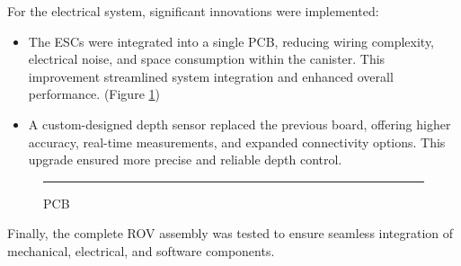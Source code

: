 For the electrical system, significant innovations were implemented:

\vspace{-0.5\baselineskip}
\begin{itemize}
    \setlength{\itemsep}{0pt}
    \item The ESCs were integrated into a single PCB, reducing wiring complexity, electrical noise, and space consumption within the canister. This improvement streamlined system integration and enhanced overall performance. (Figure \ref{fig:pcb})
    \item A custom-designed depth sensor replaced the previous board, offering higher accuracy, real-time measurements, and expanded connectivity options. This upgrade ensured more precise and reliable depth control.
\end{itemize}

\begin{figure}[h]
    \centering
    \rule{0.8\columnwidth}{4cm}
    \caption{PCB}
    \label{fig:pcb}
\end{figure}

Finally, the complete ROV assembly was tested to ensure seamless integration of mechanical, electrical, and software components.